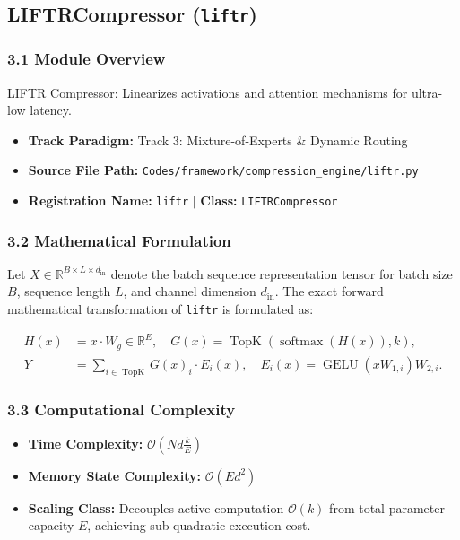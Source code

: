 \subsection{LIFTRCompressor (\texttt{liftr})}
\label{sec:app_module_liftr}

\subsubsection*{3.1 Module Overview}
LIFTR Compressor: Linearizes activations and attention mechanisms for ultra-low latency.
\begin{itemize}
    \item \textbf{Track Paradigm:} Track 3: Mixture-of-Experts & Dynamic Routing
    \item \textbf{Source File Path:} \texttt{Codes/framework/compression\_engine/liftr.py}
    \item \textbf{Registration Name:} \texttt{liftr} $\mid$ \textbf{Class:} \texttt{LIFTRCompressor}
\end{itemize}

\subsubsection*{3.2 Mathematical Formulation}
Let $X \in \mathbb{R}^{B \times L \times d_{\text{in}}}$ denote the batch sequence representation tensor for batch size $B$, sequence length $L$, and channel dimension $d_{\text{in}}$. The exact forward mathematical transformation of \texttt{liftr} is formulated as:

\begin{align}
H(x) &= x \cdot W_g \in \mathbb{R}^{E}, \quad G(x) = \operatorname{TopK}\left(\operatorname{softmax}(H(x)), k\right), \\
Y &= \sum_{i \in \operatorname{TopK}} G(x)_i \cdot E_i(x), \quad E_i(x) = \operatorname{GELU}(x W_{1, i}) W_{2, i}.
\end{align}


\subsubsection*{3.3 Computational Complexity}
\begin{itemize}
    \item \textbf{Time Complexity:} $\mathcal{O}(N d \frac{k}{E})$
    \item \textbf{Memory State Complexity:} $\mathcal{O}(E d^2)$
    \item \textbf{Scaling Class:} Decouples active computation $\mathcal{O}(k)$ from total parameter capacity $E$, achieving sub-quadratic execution cost.
\end{itemize}

